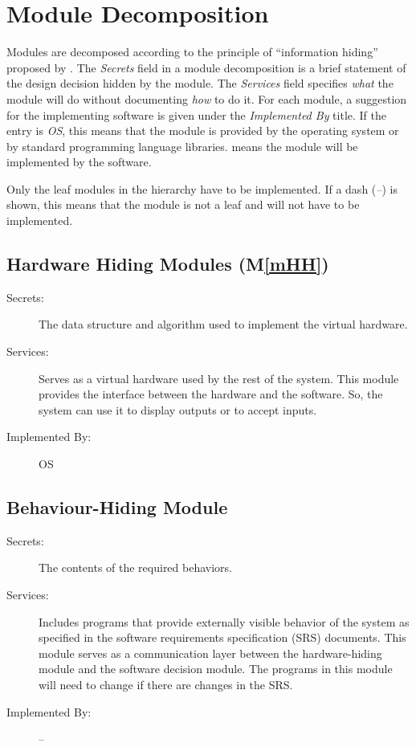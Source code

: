 \documentclass[12pt, titlepage]{article}
\newcommand{\mref}[1]{M\ref{#1}}
\begin{document}
\section{Module Decomposition} \label{SecMD}

Modules are decomposed according to the principle of ``information hiding''
proposed by \citet{ParnasEtAl1984}. The \emph{Secrets} field in a module
decomposition is a brief statement of the design decision hidden by the
module. The \emph{Services} field specifies \emph{what} the module will do
without documenting \emph{how} to do it. For each module, a suggestion for the
implementing software is given under the \emph{Implemented By} title. If the
entry is \emph{OS}, this means that the module is provided by the operating
system or by standard programming language libraries.  \emph{\progname{}} means the
module will be implemented by the \progname{} software.

Only the leaf modules in the hierarchy have to be implemented. If a dash
(\emph{--}) is shown, this means that the module is not a leaf and will not have
to be implemented.

\subsection{Hardware Hiding Modules (\mref{mHH})}

\begin{description}
\item[Secrets:]The data structure and algorithm used to implement the virtual
  hardware.
\item[Services:]Serves as a virtual hardware used by the rest of the
  system. This module provides the interface between the hardware and the
  software. So, the system can use it to display outputs or to accept inputs.
\item[Implemented By:] OS
\end{description}

\subsection{Behaviour-Hiding Module}

\begin{description}
\item[Secrets:]The contents of the required behaviors.
\item[Services:]Includes programs that provide externally visible behavior of
  the system as specified in the software requirements specification (SRS)
  documents. This module serves as a communication layer between the
  hardware-hiding module and the software decision module. The programs in this
  module will need to change if there are changes in the SRS.
\item[Implemented By:] --
\end{description}
\end{document}
